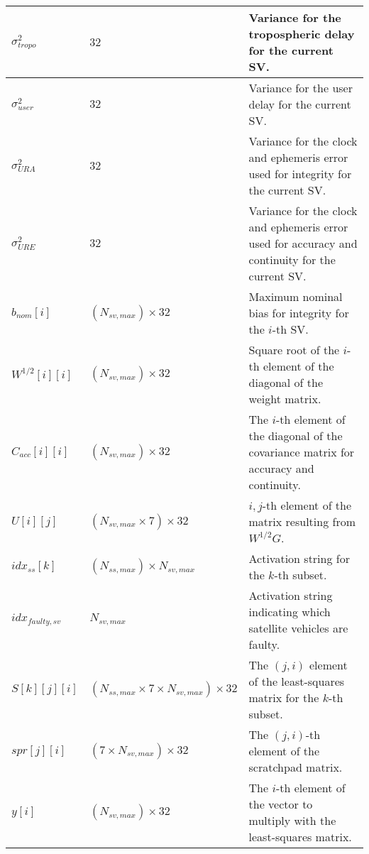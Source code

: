\documentclass[11pt]{article}
\begin{document}
\begin{table}[htbp]
\begin{center}
\begin{tabular}{|m{1.5cm}|m{2.5cm}|m{7cm}|}
    $\sigma_{tropo}^2$ & $32$ & Variance for the tropospheric delay for the current SV.\\ \hline

    $\sigma_{user}^2$ & $32$ & Variance for the user delay for the current SV.\\ \hline

    $\sigma_{URA}^2$ & $32$ & Variance for the clock and ephemeris error used for integrity for the current SV.\\ \hline

    $\sigma_{URE}^2$ & $32$ & Variance for the clock and ephemeris error used for accuracy and continuity for the current SV.\\ \hline

    $b_{nom}[i]$ & $(N_{sv,max}) \times 32$ & Maximum nominal bias for integrity for the $i$-th SV.\\ \hline

    $W^{1/2}[i][i]$ & $(N_{sv,max}) \times 32$ & Square root of the $i$-th element of the diagonal of the weight matrix.\\ \hline

    $C_{acc}[i][i]$ & $(N_{sv,max}) \times 32$ & The $i$-th element of the diagonal of the covariance matrix for accuracy and continuity.\\ \hline

    $U[i][j]$ & $(N_{sv,max} \times 7) \times 32$ & $i,j$-th element of the matrix resulting from $W^{1/2}G$.\\ \hline

    $idx_{ss}[k]$ & $(N_{ss,max}) \times N_{sv,max}$ & Activation string for the $k$-th subset.\\ \hline

    $idx_{faulty,sv}$ & $N_{sv,max}$ & Activation string indicating which satellite vehicles are faulty.\\ \hline

    $S[k][j][i]$ & $(N_{ss,max} \times 7 \times N_{sv,max}) \times 32$ & The $(j,i)$ element of the least-squares matrix for the $k$-th subset.\\ \hline

    $spr[j][i]$ & $(7 \times N_{sv,max}) \times 32$ & The $(j,i)$-th element of the scratchpad matrix.\\ \hline

    $y[i]$ & $(N_{sv,max}) \times 32$ & The $i$-th element of the vector to multiply with the least-squares matrix.\\ \hline


\end{tabular}
\end{center}
\end{table}
\end{document}
